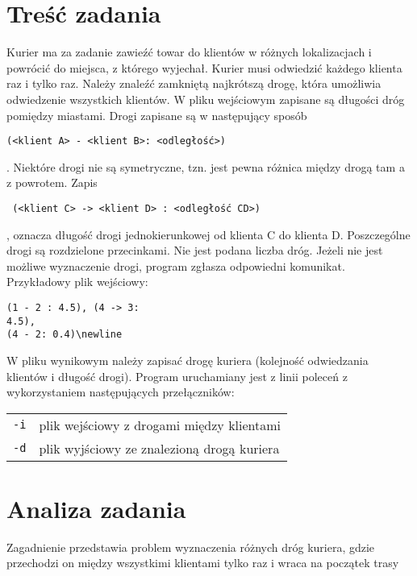 \documentclass[12pt,a4paper,twoside]{article}
\let\oldmarginpar\marginpar
\renewcommand\marginpar[1]{%
  {\linespread{0.85}\normalfont\scriptsize%
\oldmarginpar[\hspace{1cm}\begin{minipage}{3cm}\raggedleft\scriptsize\color{black}\textsf{#1}\end{minipage}]%
{\hspace{0cm}\begin{minipage}{3cm}\raggedright\scriptsize\color{black}\textsf{#1}\end{minipage}}%
}%
}
\begin{document}
\section{Treść zadania}
\marginpar{}
Kurier ma za zadanie zawieźć towar do klientów w różnych lokalizacjach i powrócić do miejsca, z którego
wyjechał. Kurier musi odwiedzić każdego klienta raz i tylko raz. Należy znaleźć zamkniętą najkrótszą drogę,
która umożliwia odwiedzenie wszystkich klientów. W pliku wejściowym zapisane są długości dróg pomiędzy
miastami. Drogi zapisane są w następujący sposób \begin{verbatim}(<klient A> - <klient B>: <odległość>)\end{verbatim}. Niektóre drogi
nie są symetryczne, tzn. jest pewna różnica między drogą tam a z powrotem. Zapis\begin{verbatim} (<klient C> -> <klient D> : <odległość CD>)\end{verbatim}, oznacza długość drogi jednokierunkowej od klienta C do klienta D. Poszczególne
drogi są rozdzielone przecinkami. Nie jest podana liczba dróg. Jeżeli nie jest możliwe wyznaczenie drogi,
program zgłasza odpowiedni komunikat. \newline 
Przykładowy plik wejściowy: \newline\newline
\begin{verbatim}
(1 - 2 : 4.5), (4 -> 3:
4.5),
(4 - 2: 0.4)\newline
\end{verbatim}
W pliku wynikowym należy zapisać drogę kuriera (kolejność odwiedzania klientów i długość drogi).
\indent Program uruchamiany jest z linii poleceń z wykorzystaniem następujących przełączników: \newline
\begin{tabular}{ll}
\indent \texttt{-i} & plik wejściowy  z drogami między klientami\\
\indent \texttt{-d} & plik wyjściowy  ze znalezioną drogą kuriera\\
\end{tabular}

\section{Analiza zadania}
\marginpar{}

Zagadnienie przedstawia problem wyznaczenia różnych dróg kuriera, gdzie przechodzi on między wszystkimi klientami tylko raz i wraca na początek trasy
\end{document}
